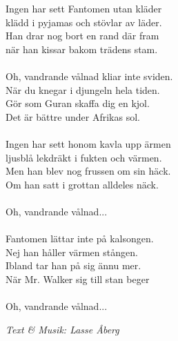 \vspace{10pt}
Ingen har sett Fantomen utan kläder\\
klädd i pyjamas och stövlar av läder.\\
Han drar nog bort en rand där fram\\
när han kissar bakom trädens stam.\\
\\
Oh, vandrande vålnad kliar inte sviden.\\
När du knegar i djungeln hela tiden.\\
Gör som Guran skaffa dig en kjol.\\
Det är bättre under Afrikas sol.\\
\\
Ingen har sett honom kavla upp ärmen\\
ljusblå lekdräkt i fukten och värmen.\\
Men han blev nog frussen om sin häck.\\
Om han satt i grottan alldeles näck.\\
\\
Oh, vandrande vålnad...\\
\\
Fantomen lättar inte på kalsongen.\\
Nej han håller värmen stången.\\
Ibland tar han på sig ännu mer.\\
När Mr. Walker sig till stan beger\\
\\
Oh, vandrande vålnad...
\par
\vspace{10pt}
{\footnotesize\textit{Text & Musik: Lasse Åberg}}
